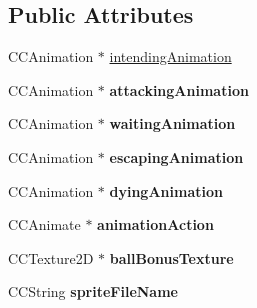 \subsection*{Public Attributes}
\begin{DoxyCompactItemize}
\item 
C\-C\-Animation $\ast$ \hyperlink{class_j_g___enemy___base_abbee7e77ffc238b8ce725bf749d771a7}{intending\-Animation}
\item 
\hypertarget{class_j_g___enemy___base_aba40ca3bfdf2755f1e54d839765e3dc7}{C\-C\-Animation $\ast$ {\bfseries attacking\-Animation}}\label{class_j_g___enemy___base_aba40ca3bfdf2755f1e54d839765e3dc7}

\item 
\hypertarget{class_j_g___enemy___base_a717c32a58a7d762f041613d75693a4c4}{C\-C\-Animation $\ast$ {\bfseries waiting\-Animation}}\label{class_j_g___enemy___base_a717c32a58a7d762f041613d75693a4c4}

\item 
\hypertarget{class_j_g___enemy___base_a6a021809fe18be6659ec986a6566658a}{C\-C\-Animation $\ast$ {\bfseries escaping\-Animation}}\label{class_j_g___enemy___base_a6a021809fe18be6659ec986a6566658a}

\item 
\hypertarget{class_j_g___enemy___base_a2a6b96de6f7d97b9bf6bf92fbdd0555f}{C\-C\-Animation $\ast$ {\bfseries dying\-Animation}}\label{class_j_g___enemy___base_a2a6b96de6f7d97b9bf6bf92fbdd0555f}

\item 
\hypertarget{class_j_g___enemy___base_a7d27718a30d366cf8934c85c423c57fc}{C\-C\-Animate $\ast$ {\bfseries animation\-Action}}\label{class_j_g___enemy___base_a7d27718a30d366cf8934c85c423c57fc}

\item 
\hypertarget{class_j_g___enemy___base_a433673314d91e149ab333347e9cc046d}{C\-C\-Texture2\-D $\ast$ {\bfseries ball\-Bonus\-Texture}}\label{class_j_g___enemy___base_a433673314d91e149ab333347e9cc046d}

\item 
\hypertarget{class_j_g___enemy___base_a3e59ea611043e0bfb426e4391cc070e7}{C\-C\-String {\bfseries sprite\-File\-Name}}\label{class_j_g___enemy___base_a3e59ea611043e0bfb426e4391cc070e7}

\end{DoxyCompactItemize}


